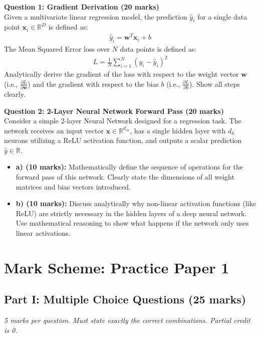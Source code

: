 \documentclass[11pt]{article}
\begin{document}
\textbf{Question 1: Gradient Derivation (20 marks)}\\
Given a multivariate linear regression model, the prediction $\hat{y}_i$ for a single data point $\mathbf{x}_i \in \mathbb{R}^D$ is defined as:
\begin{align*}
\hat{y}_i = \mathbf{w}^T \mathbf{x}_i + b
\end{align*}
The Mean Squared Error loss over $N$ data points is defined as:
\begin{align*}
L = \frac{1}{N} \sum_{i=1}^{N} (y_i - \hat{y}_i)^2
\end{align*}
Analytically derive the gradient of the loss with respect to the weight vector $\mathbf{w}$ (i.e., $\frac{\partial L}{\partial \mathbf{w}}$) and the gradient with respect to the bias $b$ (i.e., $\frac{\partial L}{\partial b}$). Show all steps clearly.

\vspace{0.5cm}

\textbf{Question 2: 2-Layer Neural Network Forward Pass (20 marks)}\\
Consider a simple 2-layer Neural Network designed for a regression task. The network receives an input vector $\mathbf{x} \in \mathbb{R}^{d_{in}}$, has a single hidden layer with $d_h$ neurons utilizing a ReLU activation function, and outputs a scalar prediction $\hat{y} \in \mathbb{R}$.

\begin{itemize}
    \item \textbf{a) (10 marks):} Mathematically define the sequence of operations for the forward pass of this network. Clearly state the dimensions of all weight matrices and bias vectors introduced.
    \item \textbf{b) (10 marks):} Discuss analytically why non-linear activation functions (like ReLU) are strictly necessary in the hidden layers of a deep neural network. Use mathematical reasoning to show what happens if the network only uses linear activations.
\end{itemize}

\newpage

\section*{Mark Scheme: Practice Paper 1}

\subsection*{Part I: Multiple Choice Questions (25 marks)}
\textit{5 marks per question. Must state exactly the correct combinations. Partial credit is 0.}
\end{document}
